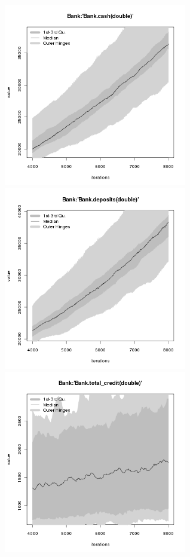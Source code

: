 \begin{figure}[H!]
\centering\leavevmode
\begin{minipage}{17cm}
\centering\leavevmode
\includegraphics[width=8cm]{./png/tax_0.05/Bank-cash.png}
\includegraphics[width=8cm]{./png/tax_0.05/Bank-deposits.png}\\
\includegraphics[width=8cm]{./png/tax_0.05/Bank-total_credit.png}

\end{minipage}
\end{figure}
